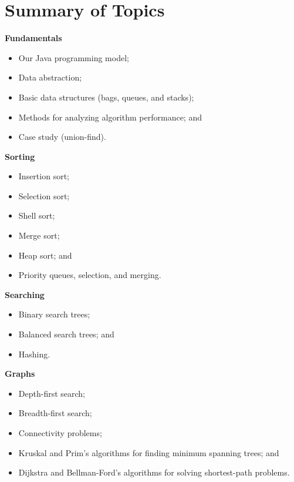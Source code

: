 \documentclass[8pt,a4paper,compress]{beamer}
\begin{document}
\section{Summary of Topics}
\begin{frame}[fragile]
\pause
\textbf{Fundamentals}
\begin{itemize}
\item Our Java programming model; 
\item Data abstraction; 
\item Basic data structures (bags, queues, and stacks);
\item Methods for analyzing algorithm performance; and
\item Case study (union-find).
\end{itemize}

\pause
\smallskip
\textbf{Sorting}
\begin{itemize}
\item Insertion sort; 
\item Selection sort;
\item Shell sort; 
\item Merge sort; 
\item Heap sort; and
\item Priority queues, selection, and merging.
\end{itemize}
\end{frame}

\begin{frame}[fragile]
\pause
\textbf{Searching}
\begin{itemize}
\item Binary search trees; 
\item Balanced search trees; and
\item Hashing.
\end{itemize}

\pause
\smallskip
\textbf{Graphs}
\begin{itemize}
\item Depth-first search; 
\item Breadth-first search; 
\item Connectivity problems; 
\item Kruskal and Prim's algorithms for finding minimum spanning trees; and
\item Dijkstra and Bellman-Ford's algorithms for solving shortest-path problems.
\end{itemize}
\end{frame}
\end{document}
